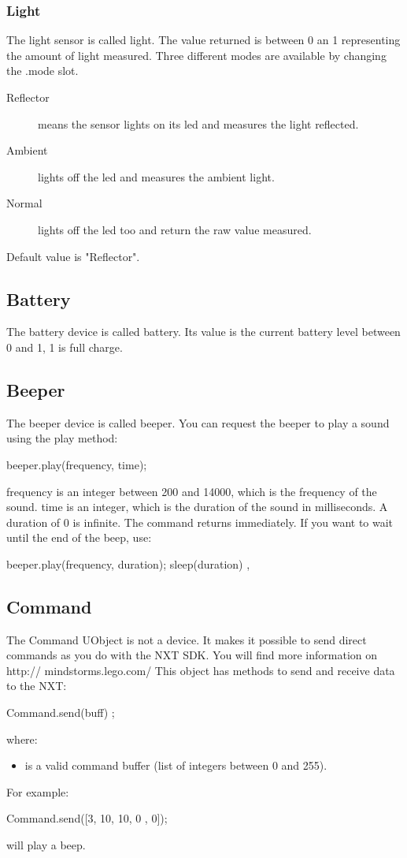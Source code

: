 \subsubsection{Light}
The light sensor is called light.
The value returned is between 0 an 1 representing the amount of light measured.
Three different modes are available by changing the .mode slot.
\begin{description}
\item[Reflector] means the sensor lights on its led and measures the light
  reflected.
\item[Ambient] lights off the led and measures the ambient light.
\item[Normal] lights off the led too and return the raw value measured.
\end{description}
Default value is "Reflector".

\subsection{Battery}
The battery device is called battery.
Its value is the current battery level between 0 and 1, 1 is full charge.
\subsection{Beeper}
The beeper device is called beeper.
You can request the beeper to play a sound using the play method:
\begin{urbiunchecked}
  beeper.play(frequency, time);
\end{urbiunchecked}

frequency is an integer between 200 and 14000, which is the frequency of the
sound. time is an integer, which is the duration of the sound in milliseconds.
A duration of 0 is infinite.
The command returns immediately. If you want to wait until the end of the beep,
use:
\begin{urbiunchecked}
  { beeper.play(frequency, duration); sleep(duration) },
\end{urbiunchecked}

\subsection{Command}
The Command UObject is not a device. It makes it possible to send direct
commands as you do with the NXT SDK. You will find more information on http://
mindstorms.lego.com/
This object has methods to send and receive data to the NXT:
\begin{urbiunchecked}
  Command.send(buff) ;
\end{urbiunchecked}
where:
\begin{itemize}
\item {} is a valid command buffer (list of integers between 0 and
  255).
\end{itemize}
For example:
\begin{urbiunchecked}
Command.send([3, 10, 10, 0 , 0]);
\end{urbiunchecked}
will play a beep.


